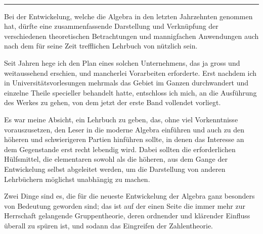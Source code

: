 \begin{center}
{\Large {}}\\[1ex]
\rule{4em}{0.4pt}
\end{center}

Bei der Entwickelung, welche die Algebra in den letzten Jahrzehnten genommen hat, dürfte eine zusammenfassende Darstellung und Verknüpfung der verschiedenen theoretischen Betrachtungen und mannigfachen Anwendungen auch nach dem für seine Zeit trefflichen Lehrbuch von  nützlich sein.

Seit Jahren hege ich den Plan eines solchen Unternehmens, das ja gross und weitaussehend erschien, und mancherlei Vorarbeiten erforderte. Erst nachdem ich in Universitätsvorlesungen mehrmals das Gebiet im Ganzen durchwandert und einzelne Theile specieller behandelt hatte, entschloss ich mich, an die Ausführung des Werkes zu gehen, von dem jetzt der erste Band vollendet vorliegt.

Es war meine Absicht, ein Lehrbuch zu geben, das, ohne viel Vorkenntnisse vorauszusetzen, den Leser in die moderne Algebra einführen und auch zu den höheren und schwierigeren Partien hinführen sollte, in denen das Interesse an dem Gegenstande erst recht lebendig wird. Dabei sollten die erforderlichen Hülfsmittel, die elementaren sowohl als die höheren, aus dem Gange der Entwickelung selbst abgeleitet werden, um die Darstellung von anderen Lehrbüchern möglichst unabhängig zu machen.

Zwei Dinge sind es, die für die neueste Entwickelung der Algebra ganz besonders von Bedeutung geworden sind; das ist auf der einen Seite die immer mehr zur Herrschaft gelangende Gruppentheorie, deren ordnender und klärender Einfluss überall zu spüren ist, und sodann das Eingreifen der Zahlentheorie.

